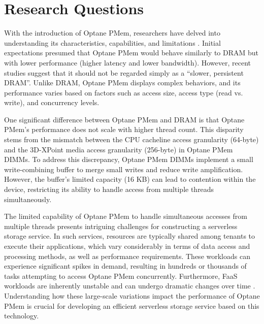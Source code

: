 
\section{Research Questions}

With the introduction of Optane PMem, researchers have delved into understanding its characteristics, capabilities, and limitations \cite{izraelevitz2019basic, yang2020empirical, wu2020ribbon}. Initial expectations presumed that Optane PMem would behave similarly to DRAM but with lower performance (higher latency and lower bandwidth). However, recent studies suggest that it should not be regarded simply as a “slower, persistent DRAM”. Unlike DRAM, Optane PMem displays complex behaviors, and its performance varies based on factors such as access size, access type (read vs. write), and concurrency levels.

One significant difference between Optane PMem and DRAM is that Optane PMem's performance does not scale with higher thread count. This disparity stems from the mismatch between the CPU cacheline access granularity (64-byte) and the 3D-XPoint media access granularity (256-byte) in Optane PMem DIMMs. To address this discrepancy, Optane PMem DIMMs implement a small write-combining buffer to merge small writes and reduce write amplification. However, the buffer’s limited capacity (16 KB) can lead to contention within the device, restricting its ability to handle access from multiple threads simultaneously.

The limited capability of Optane PMem to handle simultaneous accesses from multiple threads presents intriguing challenges for constructing a serverless storage service. In such services, resources are typically shared among tenants to execute their applications, which vary considerably in terms of data access and processing methods, as well as performance requirements. These workloads can experience significant spikes in demand, resulting in hundreds or thousands of tasks attempting to access Optane PMem concurrently. Furthermore, FaaS workloads are inherently unstable and can undergo dramatic changes over time \cite{klimovic2018pocket,jonas2019cloud}. Understanding how these large-scale variations impact the performance of Optane PMem is crucial for developing an efficient serverless storage service based on this technology.

